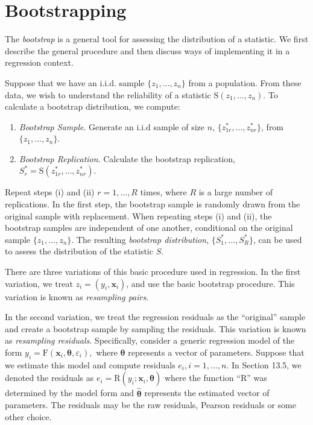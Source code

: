 \bigskip
\section{Bootstrapping}

The \emph{bootstrap} is a general tool for assessing the
distribution of a statistic. We first describe the general procedure
and then discuss ways of implementing it in a regression context.

Suppose that we have an i.i.d. sample $\{z_1, \ldots, z_n \}$ from a
population. From these data, we wish to understand the reliability
of a statistic $\mathrm{S}(z_1, \ldots, z_n )$. To calculate a
bootstrap distribution, we compute:

\begin{enumerate}
\item \textit{Bootstrap Sample}. Generate an i.i.d sample of size $n$,
$\{z^{\ast}_{1r}, \ldots, z^{\ast}_{nr} \}$, from $\{z_1, \ldots,
z_n \}$.
\item \textit{Bootstrap Replication}. Calculate the bootstrap replication,
$S^{\ast}_r =\mathrm{S}(z^{\ast}_{1r}, \ldots, z^{\ast}_{nr} )$.
\end{enumerate}
Repeat steps (i) and (ii) $r=1, \ldots, R$ times, where $R$ is a
large number of replications. In the first step, the bootstrap
sample is randomly drawn from the original sample with replacement.
When repeating steps (i) and (ii), the bootstrap samples are
independent of one another, conditional on the original sample
$\{z_1, \ldots, z_n \}$. The resulting \textit{bootstrap
distribution}, $\{S^{\ast}_1, \ldots, S^{\ast}_R\}$, can be used to
assess the distribution of the statistic $S$.

There are three variations of this basic procedure used in
regression.  In the first variation, we treat $z_i = (y_i,
\mathbf{x}_i)$, and use the basic bootstrap procedure. This
variation is known as \emph{resampling pairs}.



In the second variation, we treat the regression residuals as the
``original'' sample and create a bootstrap sample by sampling the
residuals. This variation is known as \emph{resampling residuals}.
Specifically, consider a generic regression model of the form $y_i =
\mathrm{F}(\mathbf{x}_i, \boldsymbol \theta, \varepsilon_i),$ where
$\boldsymbol \theta$ represents a vector of parameters. Suppose that
we estimate this model and compute residuals $e_i, i=1, \ldots, n$.
In Section 13.5, we denoted the residuals as $e_i = \mathrm{R}(y_i;
\mathbf{x}_i,\widehat{\boldsymbol \theta})$ where the function ``R''
was determined by the model form and $\widehat{\boldsymbol \theta}$
represents the estimated vector of parameters. The residuals may be
the raw residuals, Pearson residuals or some other choice.

